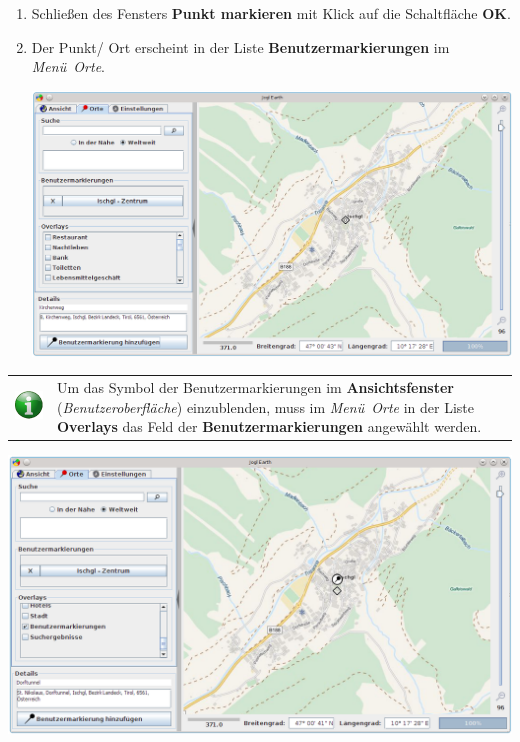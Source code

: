 \documentclass[10pt]{scrreprt}
\newcommand{\textref}[1]{\mbox{\raisebox{0.1ex}{\small$\rightarrow$ }\textit{#1}}}
\begin{document}
\begin{enumerate}
\begin{center}
	\end{center}
\item Schließen des Fensters \textbf{Punkt markieren} mit Klick auf die Schaltfläche \textbf{OK}.
\item Der Punkt/ Ort erscheint in der Liste \textbf{Benutzermarkierungen} im \textref{Menü Orte}.
	\vspace{2mm}
	\begin{center}
	\includegraphics[scale=0.3]{images/Benutzermarkierungs_Dialog3.png}
	\end{center}
\end{enumerate}


\newpage
\begin{tabular}{>{\centering \arraybackslash}m{1cm} m{14cm}} \index{Overlays}
\includegraphics[scale=0.5]{images/info.eps} & Um das Symbol der Benutzermarkierungen im \textbf{Ansichtsfenster} (\textref{Benutzeroberfläche}) einzublenden, muss im \textref{Menü Orte} in der Liste \textbf{Overlays} das Feld der \textbf{Benutzermarkierungen} angewählt werden.
\end{tabular}


\vspace{3mm}
\begin{center}
\includegraphics[scale=0.3]{images/Benutzermarkierungs_Dialog4.png}
\end{center}
\end{document}
